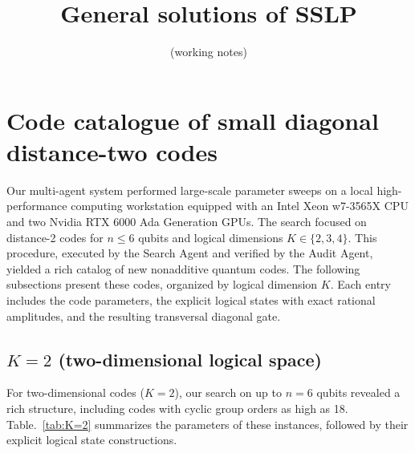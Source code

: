 \documentclass[11pt]{article}
\title{General solutions of SSLP}
\author{(working notes)}
\date{}
\begin{document}
\maketitle

\section{Code catalogue of small diagonal distance-two codes}
\label{supp:code-catalog}

Our multi-agent system performed large-scale parameter sweeps on a local high-performance computing workstation equipped with an Intel Xeon w7-3565X CPU and two Nvidia RTX 6000 Ada Generation GPUs. The search focused on distance-2 codes for $n \le 6$ qubits and logical dimensions $K \in \{2,3,4\}$. This procedure, executed by the Search Agent and verified by the Audit Agent, yielded a rich catalog of new nonadditive quantum codes. The following subsections present these codes, organized by logical dimension $K$. Each entry includes the code parameters, the explicit logical states with exact rational amplitudes, and the resulting transversal diagonal gate.

\subsection{$K=2$ (two-dimensional logical space)}

For two-dimensional codes ($K=2$), our search on up to $n=6$ qubits revealed a rich structure, including codes with cyclic group orders as high as 18. Table.~\ref{tab:K=2} summarizes the parameters of these instances, followed by their explicit logical state constructions.
\end{document}

